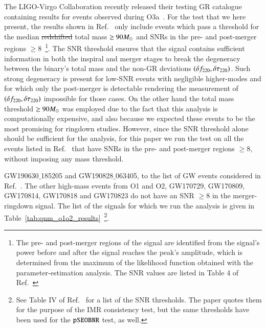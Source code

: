 The LIGO-Virgo Collaboration recently released their testing GR
catalogue containing results for events observed
during O3a~\cite{Abbott:2020jks}. For the test that we here present, the results shown in Ref.~\cite{Abbott:2020jks} only include events which pass a threshold for the median \sout{redshifted}  total mass $\geq 90 M_{\odot}$ and SNRs in the pre- and
post-merger regions $\geq 8$~\footnote{The pre- and post-merger regions of the signal are identified from the signal's power before and after the signal reaches the peak's amplitude, which is determined from the maximum of the likelihood function obtained with the parameter-estimation analysis. The SNR values are listed in Table 4 of Ref.~\cite{Abbott:2020jks}}. 
%
The SNR threshold ensures that the signal contains sufficient information in both the inspiral and merger stages to break the degeneracy between the binary's total mass and the non-GR deviations $(\delta f_{\text{220}}, \delta \tau_{\text{220}})$. Such strong degeneracy is present for low-SNR events with negligible higher-modes and for which only the post-merger is detectable rendering the measurement of $(\delta f_{\text{220}}, \delta \tau_{\text{220}})$ impossible for those cases. 
On the other hand the total mass threshold $\geq 90 M_{\odot}$ was employed due to the fact that this analysis is computationally expensive, and also because we expected these events to be the most promising for ringdown studies. However, since the SNR threshold alone should be sufficient for the analysis, for this paper we run the test on all the events listed in Ref.~\cite{Abbott:2020jks} that have SNRs in the pre- and post-merger regions $\geq 8$, without imposing any mass threshold.

  GW190630$\_$185205 and GW190828$\_$063405, to the list of GW events considered in Ref.~\cite{Abbott:2020jks}.  The other high-mass events from O1 and O2, GW170729, GW170809,
GW170814, GW170818 and GW170823 do not have an SNR $\geq 8$ in the
merger-ringdown signal. The list of the signals for which we run the analysis is given in Table~\ref{tab:qnm_o1o2_results}~\footnote{See Table IV of Ref.~\cite{Abbott:2020jks} for a list of the SNR
  thresholds. The paper quotes them for the purpose of the IMR
  consistency test, but the same thresholds have been used for the
  $\texttt{pSEOBNR}$ test, as well.}.
  
